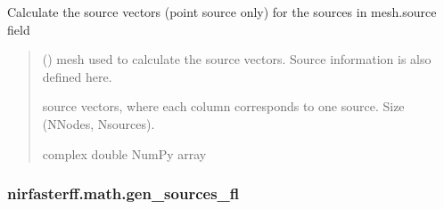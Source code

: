 \documentclass[letterpaper,10pt,english]{sphinxmanual}
\begin{document}
\begin{fulllineitems}
\label{\detokenize{_autosummary/nirfasterff.math.gen_sources:nirfasterff.math.gen_sources}}
\pysigstartsignatures
{}
\pysigstopsignatures
\sphinxAtStartPar
Calculate the source vectors (point source only) for the sources in mesh.source field
\begin{quote}\begin{description}
\sphinxAtStartPar
{} () \textendash{} mesh used to calculate the source vectors. Source information is also defined here.

\sphinxAtStartPar
{} \textendash{} source vectors, where each column corresponds to one source. Size (NNodes, Nsources).

\sphinxAtStartPar
complex double NumPy array

\end{description}\end{quote}

\end{fulllineitems}


\sphinxstepscope


\subsubsection{nirfasterff.math.gen\_sources\_fl}
\label{\detokenize{_autosummary/nirfasterff.math.gen_sources_fl:nirfasterff-math-gen-sources-fl}}\label{\detokenize{_autosummary/nirfasterff.math.gen_sources_fl::doc}}
\end{document}
